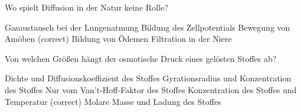 \documentclass[11pt]{exam}
\begin{document}
\begin{questions}
\vspace{3mm}\question Wo spielt Diffusion in der Natur keine Rolle?

\begin{choices}
	\choice Gasaustausch bei der Lungenatmung
	\choice Bildung des Zellpotentials
	\choice Bewegung von Amöben (correct)
	\choice Bildung von Ödemen
	\choice Filtration in der Niere
\end{choices}

\vspace{3mm}\question Von welchen Größen hängt der osmotische Druck eines gelösten Stoffes ab?

\begin{choices}
	\choice Dichte und Diffusionskoeffizient des Stoffes
	\choice Gyrationsradius und Konzentration des Stoffes
	\choice Nur vom Van't-Hoff-Faktor des Stoffes
	\choice Konzentration des Stoffes und Temperatur (correct)
	\choice Molare Masse und Ladung des Stoffes
\end{choices}

\vspace{3mm}\end{questions}
\end{document}

